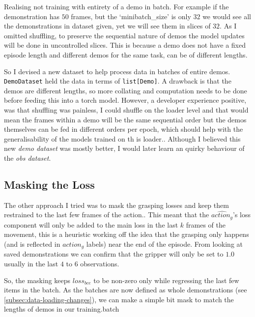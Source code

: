 Realising not training with entirety of a demo in batch. For example if the demonstration has $50$ frames, but the `minibatch\_size' is only $32$ we would see all the demonstrations in dataset given, yet we will see them in slices of $32$. As I omitted shuffling, to preserve the sequential nature of demos the model updates will be done in uncontrolled slices. This is because a demo does not have a fixed episode length and different demos for the same task, can be of different lengths.

So I devised a new dataset to help process data in batches of entire demos. \verb|DemoDataset| held the data in terms of \verb|list[Demo]|. A drawback is that the demos are different lengths, so more collating and computation needs to be done before feeding this into a torch model. However, a developer experience positive, was that shuffling was painless, I could shuffle on the loader level and that would mean the frames within a demo will be the same sequential order but the demos themselves can be fed in different orders per epoch, which should help with the generalisability of the models trained on th is loader.. Although I believed this new \emph{demo dataset} was mostly better, I would later learn an quirky behaviour of the \emph{obs dataset}.

\subsection{Masking the Loss}
The other approach I tried was to mask the grasping losses and keep them restrained to the last few frames of the action.. This meant that the $\widehat{action_g}$'s loss component will only be added to the main loss in the last $k$ frames of the movement, this is a heuristic working off the idea that the grasping only happens (and is reflected in $action_g$ labels) near the end of the episode. From looking at saved demonstrations we can confirm that the gripper will only be set to $1.0$ usually in the last $4$ to $6$ observations.

So, the masking keeps $loss_{bce}$ to be non-zero only while regressing the last few items in the batch. As the batches are now defined as whole demonstrations (see \ref{subsec:data-loading-changes}), we can make a simple bit mask to match the lengths of demos in our training.batch

